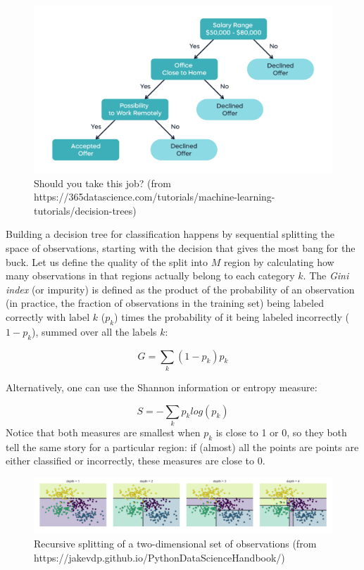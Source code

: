 \documentclass[
  letterpaper,
  DIV=11,
  numbers=noendperiod]{scrreprt}
\begin{document}
\begin{figure}

{\centering \includegraphics{./images/59utffqewug-decision-trees-image2.png}

}

\caption{Should you take this job? (from
https://365datascience.com/tutorials/machine-learning-tutorials/decision-trees)}

\end{figure}

Building a decision tree for classification happens by sequential
splitting the space of observations, starting with the decision that
gives the most bang for the buck. Let us define the quality of the split
into \(M\) region by calculating how many observations in that regions
actually belong to each category \(k\). The \emph{Gini index} (or
impurity) is defined as the product of the probability of an observation
(in practice, the fraction of observations in the training set) being
labeled correctly with label \(k\) (\(p_k\)) times the probability of it
being labeled incorrectly (\(1-p_k\)), summed over all the labels \(k\):

\[
G = \sum_k (1-p_k)p_k
\]

Alternatively, one can use the Shannon information or entropy measure:

\[
S = -\sum_k p_k log(p_k)
\] Notice that both measures are smallest when \(p_k\) is close to 1 or
0, so they both tell the same story for a particular region: if (almost)
all the points are points are either classified or incorrectly, these
measures are close to 0.

\begin{figure}

{\centering \includegraphics{./images/05.08-decision-tree-levels.png}

}

\caption{Recursive splitting of a two-dimensional set of observations
(from https://jakevdp.github.io/PythonDataScienceHandbook/)}

\end{figure}
\end{document}
